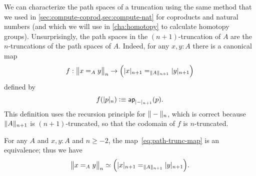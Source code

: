 We can characterize the path spaces of a truncation using the same method that we used in \autoref{sec:compute-coprod,sec:compute-nat} for coproducts and natural numbers (and which we will use in \autoref{cha:homotopy} to calculate homotopy groups).
Unsurprisingly, the path spaces in the $(n+1)$-truncation of $A$ are the $n$-truncations of the path spaces of $A$.
Indeed, for any $x,y:A$ there is a canonical map
\begin{equation}
  f:\ttrunc n{x=_Ay}\to \Big(\tproj {n+1}x=_{\trunc{n+1}A}\tproj {n+1}y\Big)\label{eq:path-trunc-map}
\end{equation}
defined by
\[f(\tproj n{p})\defeq \apfunc{\tproj {n+1}-}(p). \]
This definition uses the recursion principle for $\trunc n-$, which is correct because $\trunc {n+1}A$ is $(n+1)$-truncated, so that the codomain of $f$ is $n$-truncated.

\begin{thm}
  For any $A$ and $x,y:A$ and $n\ge -2$, the map~\eqref{eq:path-trunc-map} is an equivalence; thus we have
  \[ \eqv{\ttrunc n{x=_Ay}}{\Big(\tproj {n+1}x=_{\trunc{n+1}A}\tproj {n+1}y\Big)}. \]
\end{thm}

